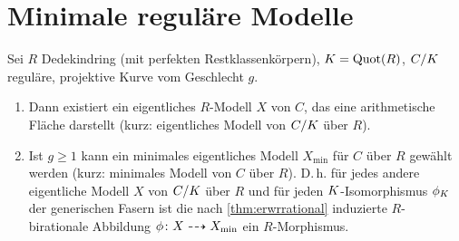 \documentclass[german]{scrreprt}
\begin{document}
\section{Minimale reguläre Modelle}
\begin{Definition}
  Sei $R$ Dedekindring (mit perfekten Restklassenkörpern),
  $K=\operatorname{Quot}(R)$,
  $C/K$ reguläre, projektive Kurve vom Geschlecht $g$.
  \begin{enumerate}[label=(\roman*)]
  \item\cite[Proposition IV.4.5(a)]{silverman2}
    Dann existiert ein eigentliches $R$-Modell $X$ von $C$,
    das eine arithmetische Fläche darstellt
    (kurz: eigentliches Modell von $C/K$ über $R$).
  \item\cite[Proposition IV.4.5(b)]{silverman2} Ist $g\geq1$ kann
    ein minimales eigentliches Modell $X_{\text{min}}$ für $C$ über
    $R$ gewählt werden (kurz: minimales Modell von $C$ über $R$).
    D.\,h. für jedes andere eigentliche Modell $X$ von
    $C/K$ über $R$ und für jeden $K$-Isomorphismus $\phi_{K}$ der
    generischen Fasern ist die nach \ref{thm:erwrrational}
    induzierte $R$-birationale Abbildung $\phi\colon X\dashrightarrow
    X_{\text{min}}$ ein $R$-Morphismus.
  \end{enumerate}
\end{Definition}
\end{document}
